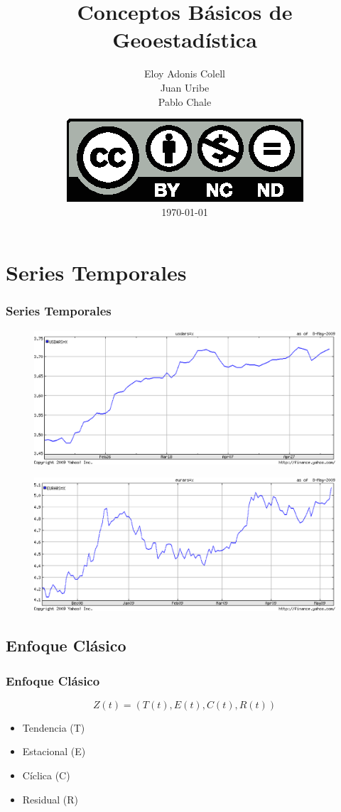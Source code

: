 \documentclass{beamer}
\title{Conceptos Básicos de Geoestadística}
\author{Eloy Adonis Colell\\Juan Uribe\\Pablo Chale}
\institute{Universidad Nacional de Luján}
\date{\includegraphics[clip,scale=0.4]{document/image/by-nc-nd.eps}\\ \today}
\begin{document}
\begin{frame}
\titlepage
\end{frame}





\section{Series Temporales}
\begin{frame}
\frametitle{Series Temporales}
\begin{figure}
\includegraphics[scale=0.24]{image/usdars.eps}
\end{figure}
\begin{figure}
\includegraphics[scale=0.24]{image/eurars.eps}
\end{figure}
\end{frame}


\subsection{Enfoque Clásico}
\begin{frame}
\frametitle{Enfoque Clásico}
\begin{equation}
Z(t) = (T(t), E(t), C(t), R(t))
\end{equation}
\begin{itemize}
\item Tendencia (T)
\item Estacional (E)
\item Cíclica (C)
\item Residual (R)
\end{itemize}
\end{frame}
\end{document}
